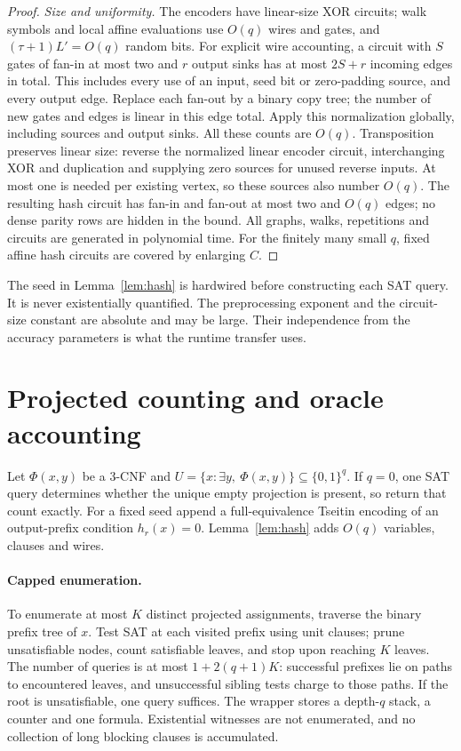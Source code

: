 \documentclass[11pt]{article}
\theoremstyle{remark}
\begin{document}
\begin{proof}
\emph{Size and uniformity.}
The encoders have linear-size XOR circuits; walk symbols and
local affine evaluations use \(O(q)\) wires and gates, and
\((\tau+1)L'=O(q)\) random bits.
For explicit wire accounting, a circuit with \(S\) gates of fan-in
at most two and \(r\) output sinks has at most \(2S+r\) incoming
edges in total. This includes every use of an input, seed bit or
zero-padding source, and every output edge. Replace each fan-out by
a binary copy tree; the number of new gates and edges is linear
in this edge total. Apply this normalization globally, including
sources and output sinks. All these counts are \(O(q)\).
Transposition preserves linear size: reverse the normalized linear
encoder circuit, interchanging XOR and duplication and supplying
zero sources for unused reverse inputs. At most one is needed per
existing vertex, so these sources also number \(O(q)\).
The resulting hash circuit has fan-in and fan-out at most two
and \(O(q)\) edges; no dense parity rows are hidden in the bound.
All graphs, walks, repetitions and circuits are generated in
polynomial time. For the finitely many small \(q\), fixed affine
hash circuits are covered by enlarging \(C\).
\end{proof}

The seed in Lemma~\ref{lem:hash} is hardwired before constructing
each SAT query. It is never existentially quantified.
The preprocessing exponent and the circuit-size constant are
absolute and may be large. Their independence from the accuracy
parameters is what the runtime transfer uses.

\section{Projected counting and oracle accounting}
\label{app:counter}

Let \(\Phi(x,y)\) be a 3-CNF and
\(U=\{x:\exists y,\ \Phi(x,y)\}\subseteq\{0,1\}^q\).
If \(q=0\), one SAT query determines whether the unique empty
projection is present, so return that count exactly.
For a fixed seed append a full-equivalence Tseitin encoding of
an output-prefix condition \(h_r(x)=0\). Lemma~\ref{lem:hash}
adds \(O(q)\) variables, clauses and wires.

\paragraph{Capped enumeration.}
To enumerate at most \(K\) distinct projected assignments, traverse
the binary prefix tree of \(x\). Test SAT at each visited prefix
using unit clauses; prune unsatisfiable nodes, count satisfiable
leaves, and stop upon reaching \(K\) leaves.
The number of queries is at most \(1+2(q+1)K\):
successful prefixes lie on paths to encountered leaves,
and unsuccessful sibling tests charge to those paths.
If the root is unsatisfiable, one query suffices.
The wrapper stores a depth-\(q\) stack, a counter and one formula.
Existential witnesses are not enumerated, and no collection of
long blocking clauses is accumulated.
\end{document}
